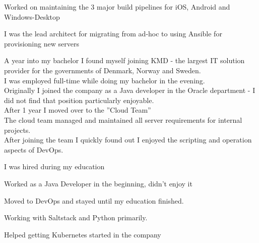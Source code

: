 \documentclass[]{cv}
\begin{document}
\begin{minipage}[t]{0.66\textwidth}
\begin{tightemize}
	\item Worked on maintaining the 3 major build pipelines for iOS, Android and	Windows-Desktop
	\item I was the lead architect for migrating from ad-hoc to using Ansible for provisioning new servers
\end{tightemize}
\sectionsep


A year into my bachelor I found myself joining KMD - the largest IT solution provider for the governments of Denmark, Norway and Sweden. \\
I was employed full-time while doing my bachelor in the evening. \\
Originally I joined the company as a Java developer in the Oracle department - I did not find that position particularly enjoyable. \\
After 1 year I moved over to the ”Cloud Team” \\
The cloud team managed and maintained all server requirements for internal projects. \\
After joining the team I quickly found out I enjoyed the scripting and operation aspects of DevOps.

\begin{tightemize}
	\item I was hired during my education
	\item Worked as a Java Developer in the beginning, didn’t enjoy it
	\item Moved to DevOps and stayed until my education finished.
	\item Working with Saltstack and Python primarily.
	\item Helped getting Kubernetes started in the company
\end{tightemize}
\sectionsep

\end{minipage} 
\end{document}
